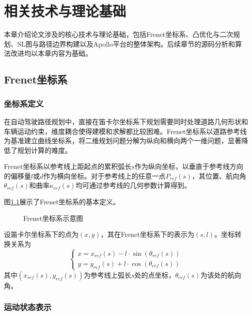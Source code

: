 \chapter{相关技术与理论基础}
\label{chap:theory}

本章介绍论文涉及的核心技术与理论基础，包括Frenet坐标系、凸优化与二次规划、SL图与路径边界构建以及Apollo平台的整体架构。后续章节的源码分析和算法改进均以本章内容为基础。

\section{Frenet坐标系}

\subsection{坐标系定义}

在自动驾驶路径规划中，直接在笛卡尔坐标系下规划需要同时处理道路几何形状和车辆运动约束，维度耦合使得建模和求解都比较困难。Frenet坐标系\cite{werling2010}以道路参考线为基准建立曲线坐标系，将二维规划问题分解为纵向和横向两个一维问题，显著降低了规划计算的难度。

Frenet坐标系以参考线上距起点的累积弧长$s$作为纵向坐标，以垂直于参考线方向的偏移量$l$或$d$作为横向坐标。对于参考线上的任意一点$P_{ref}(s)$，其位置、航向角$\theta_{ref}(s)$和曲率$\kappa_{ref}(s)$均可通过参考线的几何参数计算得到。

图\ref{fig:frenet}展示了Frenet坐标系的基本定义。

\begin{figure}[htbp]
\centering
{}
\caption{Frenet坐标系示意图}
\label{fig:frenet}
\end{figure}

设笛卡尔坐标系下的点为$(x, y)$，其在Frenet坐标系下的表示为$(s, l)$。坐标转换关系为
\begin{equation}
\begin{cases}
x = x_{ref}(s) - l \cdot \sin(\theta_{ref}(s)) \\
y = y_{ref}(s) + l \cdot \cos(\theta_{ref}(s))
\end{cases}
\label{eq:frenet_transform}
\end{equation}
其中$(x_{ref}(s), y_{ref}(s))$为参考线上弧长$s$处的点坐标，$\theta_{ref}(s)$为该处的航向角。

\subsection{运动状态表示}

